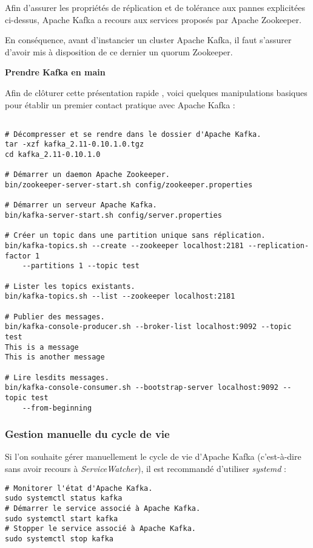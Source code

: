 \documentclass[a4paper,oneside,12pt]{article}
\begin{document}
Afin d'assurer les propriétés de réplication et de tolérance aux 
pannes explicitées ci-dessus, Apache Kafka a recours aux services
proposés par Apache Zookeeper.

En conséquence, avant d'instancier un cluster Apache Kafka, il faut
s'assurer d'avoir mis à disposition de ce dernier un quorum Zookeeper.

\textbf{Prendre Kafka en main}

Afin de clôturer cette présentation rapide , voici quelques 
manipulations basiques pour établir un premier contact pratique 
avec Apache Kafka :
\begin{verbatim}

# Décompresser et se rendre dans le dossier d'Apache Kafka.
tar -xzf kafka_2.11-0.10.1.0.tgz
cd kafka_2.11-0.10.1.0

# Démarrer un daemon Apache Zookeeper.
bin/zookeeper-server-start.sh config/zookeeper.properties

# Démarrer un serveur Apache Kafka.
bin/kafka-server-start.sh config/server.properties

# Créer un topic dans une partition unique sans réplication.
bin/kafka-topics.sh --create --zookeeper localhost:2181 --replication-factor 1 
	--partitions 1 --topic test
	
# Lister les topics existants.
bin/kafka-topics.sh --list --zookeeper localhost:2181

# Publier des messages.
bin/kafka-console-producer.sh --broker-list localhost:9092 --topic test
This is a message
This is another message

# Lire lesdits messages.
bin/kafka-console-consumer.sh --bootstrap-server localhost:9092 --topic test 
	--from-beginning
\end{verbatim}

\subsubsection{Gestion manuelle du cycle de vie}

Si l'on souhaite gérer manuellement le cycle de vie d'Apache Kafka 
(c'est-à-dire sans avoir recours à \textit{ServiceWatcher}), il est 
recommandé d'utiliser \textit{systemd} :

\begin{verbatim}
# Monitorer l'état d'Apache Kafka.
sudo systemctl status kafka
# Démarrer le service associé à Apache Kafka.
sudo systemctl start kafka
# Stopper le service associé à Apache Kafka.
sudo systemctl stop kafka
\end{verbatim}
\end{document}
